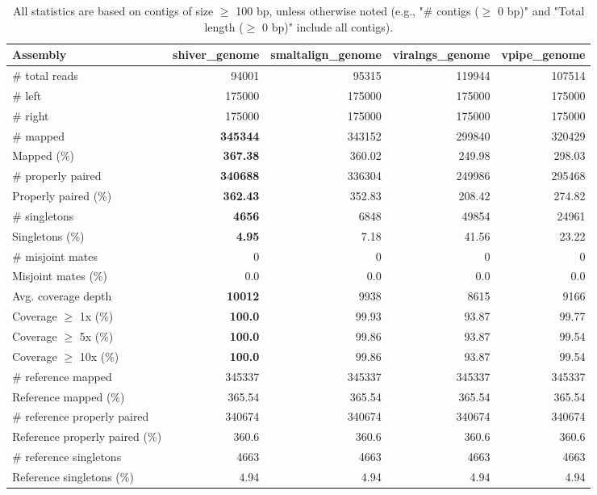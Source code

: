 \documentclass[12pt,a4paper]{article}
\begin{document}
\begin{table}[ht]
\begin{center}
\caption{All statistics are based on contigs of size $\geq$ 100 bp, unless otherwise noted (e.g., "\# contigs ($\geq$ 0 bp)" and "Total length ($\geq$ 0 bp)" include all contigs).}
\begin{tabular}{|l*{4}{|r}|}
\hline
Assembly & shiver\_genome & smaltalign\_genome & viralngs\_genome & vpipe\_genome \\ \hline
\# total reads & 94001 & 95315 & 119944 & 107514 \\ \hline
\# left & 175000 & 175000 & 175000 & 175000 \\ \hline
\# right & 175000 & 175000 & 175000 & 175000 \\ \hline
\# mapped & {\bf 345344} & 343152 & 299840 & 320429 \\ \hline
Mapped (\%) & {\bf 367.38} & 360.02 & 249.98 & 298.03 \\ \hline
\# properly paired & {\bf 340688} & 336304 & 249986 & 295468 \\ \hline
Properly paired (\%) & {\bf 362.43} & 352.83 & 208.42 & 274.82 \\ \hline
\# singletons & {\bf 4656} & 6848 & 49854 & 24961 \\ \hline
Singletons (\%) & {\bf 4.95} & 7.18 & 41.56 & 23.22 \\ \hline
\# misjoint mates & 0 & 0 & 0 & 0 \\ \hline
Misjoint mates (\%) & 0.0 & 0.0 & 0.0 & 0.0 \\ \hline
Avg. coverage depth & {\bf 10012} & 9938 & 8615 & 9166 \\ \hline
Coverage $\geq$ 1x (\%) & {\bf 100.0} & 99.93 & 93.87 & 99.77 \\ \hline
Coverage $\geq$ 5x (\%) & {\bf 100.0} & 99.86 & 93.87 & 99.54 \\ \hline
Coverage $\geq$ 10x (\%) & {\bf 100.0} & 99.86 & 93.87 & 99.54 \\ \hline
\# reference mapped & 345337 & 345337 & 345337 & 345337 \\ \hline
Reference mapped (\%) & 365.54 & 365.54 & 365.54 & 365.54 \\ \hline
\# reference properly paired & 340674 & 340674 & 340674 & 340674 \\ \hline
Reference properly paired (\%) & 360.6 & 360.6 & 360.6 & 360.6 \\ \hline
\# reference singletons & 4663 & 4663 & 4663 & 4663 \\ \hline
Reference singletons (\%) & 4.94 & 4.94 & 4.94 & 4.94 \\ \hline

\end{tabular}
\end{center}
\end{table}
\end{document}
